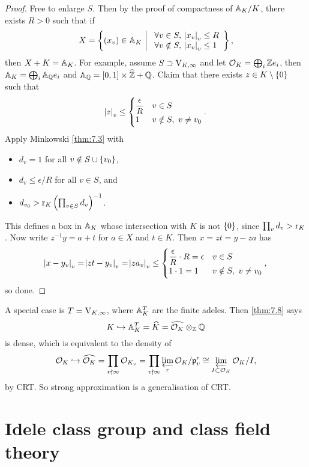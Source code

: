 \begin{proof}
Free to enlarge $ S $. Then by the proof of compactness of $ \AA_K / K $, there exists $ R > 0 $ such that if
$$ X = \cbr{\br{x_v} \in \AA_K \st \begin{array}{l} \forall v \in S, \ \abs{x_v}_v \le R \\ \forall v \notin S, \ \abs{x_v}_v \le 1 \end{array}}, $$
then $ X + K = \AA_K $. For example, assume $ S \supset \V_{K, \infty} $ and let $ \OOO_K = \bigoplus_i \ZZ e_i $, then $ \AA_K = \bigoplus_i \AA_\QQ e_i $ and $ \AA_\QQ = \sbr{0, 1} \times \widehat{\ZZ} + \QQ $. Claim that there exists $ z \in K \setminus \cbr{0} $ such that
$$ \abs{z}_v \le
\begin{cases}
\dfrac{\epsilon}{R} & v \in S \\
1 & v \notin S, \ v \ne v_0
\end{cases}.
$$
Apply Minkowski \ref{thm:7.3} with
\begin{itemize}
\item $ d_v = 1 $ for all $ v \notin S \cup \cbr{v_0} $,
\item $ d_v \le \epsilon / R $ for all $ v \in S $, and
\item $ d_{v_0} > \r_K\br{\prod_{v \in S} d_v}^{-1} $.
\end{itemize}
This defines a box in $ \AA_K $ whose intersection with $ K $ is not $ \cbr{0} $, since $ \prod_v d_v > \r_K $. Now write $ z^{-1}y = a + t $ for $ a \in X $ and $ t \in K $. Then $ x = zt = y - za $ has
$$ \abs{x - y_v}_v = \abs{zt - y_v}_v = \abs{za_v}_v \le
\begin{cases}
\dfrac{\epsilon}{R} \cdot R = \epsilon & v \in S \\
1 \cdot 1 = 1 & v \notin S, \ v \ne v_0
\end{cases},
$$
so done.
\end{proof}

A special case is $ T = \V_{K, \infty} $, where $ \AA_K^T $ are the finite adeles. Then \ref{thm:7.8} says
$$ K \hookrightarrow \AA_K^T = \widehat{K} = \widehat{\OOO_K} \otimes_\ZZ \QQ $$
is dense, which is equivalent to the density of
$$ \OOO_K \hookrightarrow \widehat{\OOO_K} = \prod_{v \nmid \infty} \OOO_{K_v} = \prod_{v \nmid \infty} \varprojlim_r \OOO_K / \ppp_v^r \cong \varprojlim_{I \subset \OOO_K} \OOO_K / I, $$
by CRT. So strong approximation is a generalisation of CRT.

\pagebreak

\section{Idele class group and class field theory}

